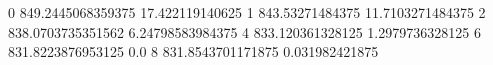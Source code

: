 0 849.2445068359375 17.422119140625
1 843.53271484375 11.7103271484375
2 838.0703735351562 6.24798583984375
4 833.120361328125 1.2979736328125
6 831.8223876953125 0.0
8 831.8543701171875 0.031982421875
